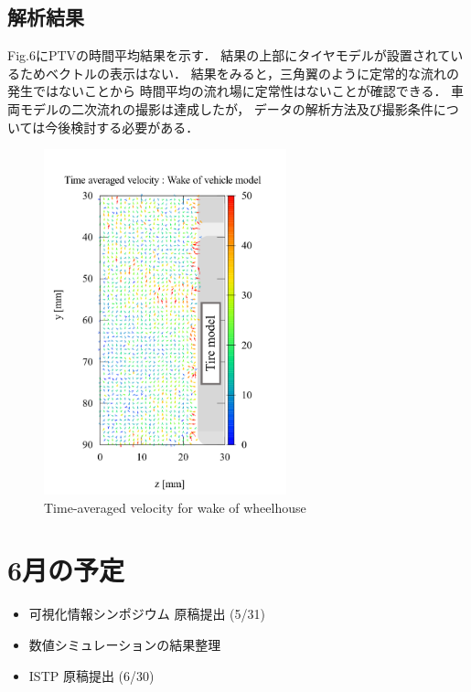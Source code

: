 \documentclass[twocolumn,a4j]{jsarticle}
\begin{document}
\newpage
\subsection*{解析結果}
Fig.6にPTVの時間平均結果を示す．
結果の上部にタイヤモデルが設置されているためベクトルの表示はない．
結果をみると，三角翼のように定常的な流れの発生ではないことから
時間平均の流れ場に定常性はないことが確認できる．
車両モデルの二次流れの撮影は達成したが，
データの解析方法及び撮影条件については今後検討する必要がある．

\begin{figure}[htbp]
  \footnotesize
  \begin{center}
    \includegraphics[width=70mm]{../images/time-averaged_velosity_of_vehicle_model_2.png}
    \caption{Time-averaged velocity for wake of wheelhouse}
  \end{center}
\end{figure}

\section{6月の予定}
\begin{itemize}
  \item 可視化情報シンポジウム 原稿提出 (5/31)
  \item 数値シミュレーションの結果整理
  \item ISTP 原稿提出 (6/30)
\end{itemize}
\end{document}
